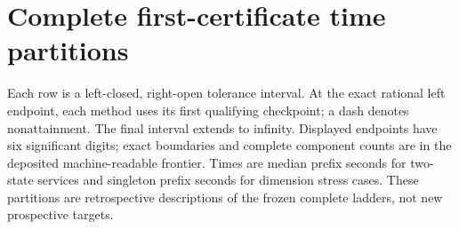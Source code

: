 \section{Complete first-certificate time partitions}\label{supp:frontier-table48}
Each row is a left-closed, right-open tolerance interval. At the exact rational left endpoint, each method uses its first qualifying checkpoint; a dash denotes nonattainment. The final interval extends to infinity. Displayed endpoints have six significant digits; exact boundaries and complete component counts are in the deposited machine-readable frontier. Times are median prefix seconds for two-state services and singleton prefix seconds for dimension stress cases. These partitions are retrospective descriptions of the frozen complete ladders, not new prospective targets.










